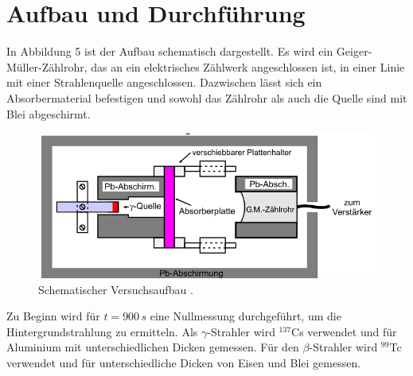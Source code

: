 \section{Aufbau und Durchführung}
\label{sec:Durchfuehrung}
In Abbildung 5 ist der Aufbau schematisch dargestellt. Es wird ein Geiger-Müller-Zählrohr, das an ein
elektrisches Zählwerk angeschlossen ist, in einer Linie mit einer Strahlenquelle angeschlossen. Dazwischen
lässt sich ein Absorbermaterial befestigen und sowohl das Zählrohr als auch die Quelle sind mit Blei abgeschirmt.
\begin{figure}
    \centering
    \label{fig:Aufbau}
    \includegraphics{Bilder/Aufbau.png}
    \caption{Schematischer Versuchsaufbau \cite{sample}.}
\end{figure}
Zu Beginn wird für $t=900\,\unit{s}$ eine Nullmessung durchgeführt, um die Hintergrundstrahlung zu ermitteln.
Als $\gamma$-Strahler wird $^{137}$Cs verwendet und für Aluminium mit unterschiedlichen Dicken gemessen. Für den
$\beta$-Strahler wird $^{99}$Tc verwendet und für unterschiedliche Dicken von Eisen und Blei gemessen.